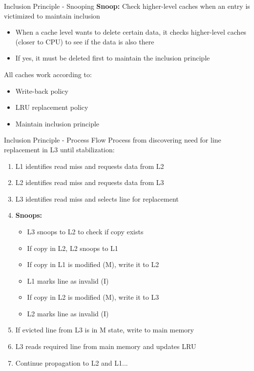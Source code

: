 \documentclass[aspectratio=169,12pt]{beamer}
\begin{document}
\begin{frame}{Inclusion Principle - Snooping}
\textbf{Snoop:} Check higher-level caches when an entry is victimized to maintain inclusion

\begin{itemize}
    \item When a cache level wants to delete certain data, it checks higher-level caches (closer to CPU) to see if the data is also there
    \item If yes, it must be deleted first to maintain the inclusion principle
\end{itemize}

All caches work according to:
\begin{itemize}
    \item Write-back policy
    \item LRU replacement policy
    \item Maintain inclusion principle
\end{itemize}
\end{frame}

\begin{frame}{Inclusion Principle - Process Flow}
\small
Process from discovering need for line replacement in L3 until stabilization:

\begin{enumerate}
    \item L1 identifies read miss and requests data from L2
    \item L2 identifies read miss and requests data from L3
    \item L3 identifies read miss and selects line for replacement
    \item \textbf{Snoops:}
    \begin{itemize}
        \item L3 snoops to L2 to check if copy exists
        \item If copy in L2, L2 snoops to L1
        \item If copy in L1 is modified (M), write it to L2
        \item L1 marks line as invalid (I)
        \item If copy in L2 is modified (M), write it to L3
        \item L2 marks line as invalid (I)
    \end{itemize}
    \item If evicted line from L3 is in M state, write to main memory
    \item L3 reads required line from main memory and updates LRU
    \item Continue propagation to L2 and L1...
\end{enumerate}
\end{frame}
\end{document}
